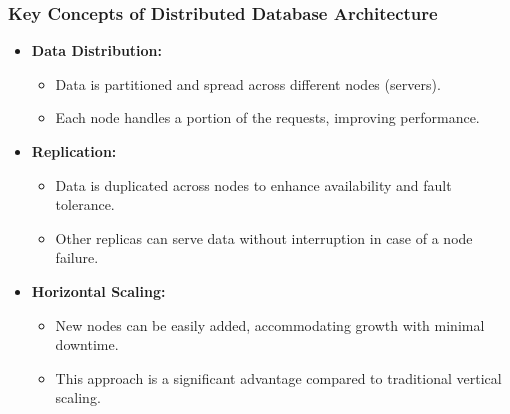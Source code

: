 \documentclass[aspectratio=169]{beamer}
\begin{document}
\begin{frame}[fragile]
    \frametitle{Key Concepts of Distributed Database Architecture}
    \begin{itemize}
        \item \textbf{Data Distribution:}
        \begin{itemize}
            \item Data is partitioned and spread across different nodes (servers).
            \item Each node handles a portion of the requests, improving performance.
        \end{itemize}
        
        \item \textbf{Replication:}
        \begin{itemize}
            \item Data is duplicated across nodes to enhance availability and fault tolerance.
            \item Other replicas can serve data without interruption in case of a node failure.
        \end{itemize}
        
        \item \textbf{Horizontal Scaling:}
        \begin{itemize}
            \item New nodes can be easily added, accommodating growth with minimal downtime.
            \item This approach is a significant advantage compared to traditional vertical scaling.
        \end{itemize}
    \end{itemize}
\end{frame}
\end{document}
